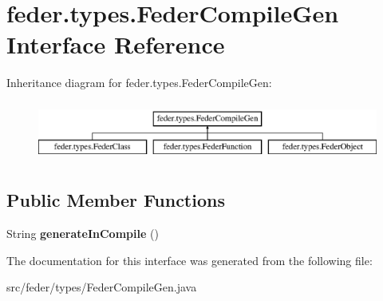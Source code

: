 \hypertarget{interfacefeder_1_1types_1_1FederCompileGen}{}\section{feder.\+types.\+Feder\+Compile\+Gen Interface Reference}
\label{interfacefeder_1_1types_1_1FederCompileGen}
Inheritance diagram for feder.\+types.\+Feder\+Compile\+Gen\+:\begin{figure}[H]
\begin{center}
\leavevmode
\includegraphics[height=1.964912cm]{interfacefeder_1_1types_1_1FederCompileGen}
\end{center}
\end{figure}
\subsection*{Public Member Functions}
\begin{DoxyCompactItemize}
\item 
\mbox{\label{interfacefeder_1_1types_1_1FederCompileGen_ab952553ac05aa692aee4bead3268ba12}} 
String {\bfseries generate\+In\+Compile} ()
\end{DoxyCompactItemize}


The documentation for this interface was generated from the following file\+:\begin{DoxyCompactItemize}
\item 
src/feder/types/Feder\+Compile\+Gen.\+java\end{DoxyCompactItemize}
